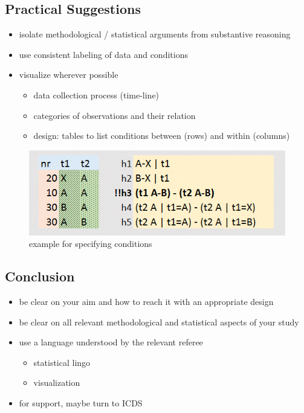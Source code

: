 \documentclass[]{article}
\providecommand{\tightlist}{%
  \setlength{\itemsep}{0pt}\setlength{\parskip}{0pt}}
\begin{document}
\newpage

\subsection{Practical Suggestions}\label{practical-suggestions}

\begin{itemize}
\tightlist
\item
  isolate methodological / statistical arguments from substantive
  reasoning
\item
  use consistent labeling of data and conditions
\item
  visualize wherever possible

  \begin{itemize}
  \tightlist
  \item
    data collection process (time-line)
  \item
    categories of observations and their relation
  \item
    design: tables to list conditions between (rows) and within
    (columns)
  \end{itemize}
\end{itemize}

\begin{figure}[htbp]
\centering
\includegraphics{conds.png}
\caption{example for specifying conditions}
\end{figure}

\subsection{Conclusion}\label{conclusion}

\begin{itemize}
\tightlist
\item
  be clear on your aim and how to reach it with an appropriate design
\item
  be clear on all relevant methodological and statistical aspects of
  your study
\item
  use a language understood by the relevant referee

  \begin{itemize}
  \tightlist
  \item
    statistical lingo
  \item
    visualization
  \end{itemize}
\item
  for support, maybe turn to ICDS 
\end{itemize}
\end{document}
